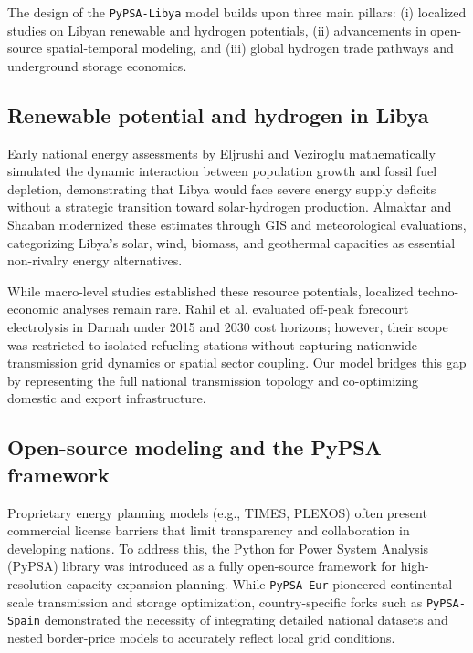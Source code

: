 \documentclass[preprint,12pt]{elsarticle}
\begin{document}
The design of the \texttt{PyPSA-Libya} model builds upon three main pillars: (i) localized studies on Libyan renewable and hydrogen potentials, (ii) advancements in open-source spatial-temporal modeling, and (iii) global hydrogen trade pathways and underground storage economics.

\subsection{Renewable potential and hydrogen in Libya}
Early national energy assessments by Eljrushi and Veziroglu \cite{eljrushi1990solar} mathematically simulated the dynamic interaction between population growth and fossil fuel depletion, demonstrating that Libya would face severe energy supply deficits without a strategic transition toward solar-hydrogen production. Almaktar and Shaaban \cite{almaktar2021prospects} modernized these estimates through GIS and meteorological evaluations, categorizing Libya's solar, wind, biomass, and geothermal capacities as essential non-rivalry energy alternatives. 

While macro-level studies established these resource potentials, localized techno-economic analyses remain rare. Rahil et al. \cite{rahil2018techno} evaluated off-peak forecourt electrolysis in Darnah under 2015 and 2030 cost horizons; however, their scope was restricted to isolated refueling stations without capturing nationwide transmission grid dynamics or spatial sector coupling. Our model bridges this gap by representing the full national transmission topology and co-optimizing domestic and export infrastructure.

\subsection{Open-source modeling and the PyPSA framework}
Proprietary energy planning models (e.g., TIMES, PLEXOS) often present commercial license barriers that limit transparency and collaboration in developing nations. To address this, the Python for Power System Analysis (PyPSA) library was introduced as a fully open-source framework for high-resolution capacity expansion planning. While \texttt{PyPSA-Eur} pioneered continental-scale transmission and storage optimization, country-specific forks such as \texttt{PyPSA-Spain} \cite{gallego2025pypsaspain} demonstrated the necessity of integrating detailed national datasets and nested border-price models to accurately reflect local grid conditions.
\end{document}

